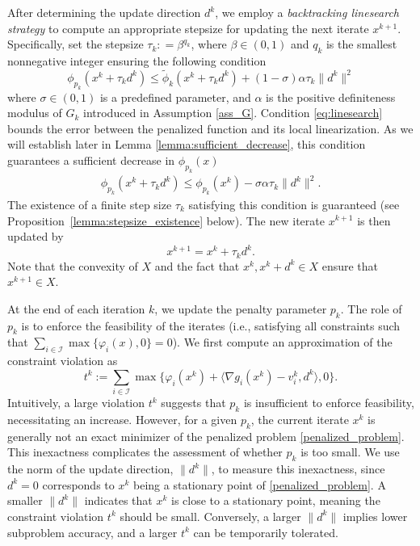 \documentclass[11pt,a4paper]{article}
\theoremstyle{plain}
\begin{document}
After determining the update direction $d^k$, we employ a {\em backtracking linesearch strategy} to compute an appropriate stepsize for updating the next iterate $x^{k+1}$. Specifically, set the stepsize $\tau_k: = \beta^{q_k}$, where $\beta \in (0,1)$ and $q_k$ is the smallest nonnegative integer ensuring the following condition
\begin{equation}\label{eq:linesearch}
{\phi_{p_k}(x^k + \tau_k d^k) \leq \tilde\phi_{k}(x^k+\tau_kd^k) + (1-\sigma) \alpha \tau_k \| d^k \|^2}
\end{equation}
where $\sigma \in (0,1)$ is a predefined parameter, and $\alpha$ is the positive definiteness modulus of $G_k$ introduced in Assumption \ref{ass_G}. {Condition \eqref{eq:linesearch} bounds the error between the penalized function and its local linearization. As we will establish later in Lemma \ref{lemma:sufficient_decrease}, this condition guarantees a sufficient decrease in $\phi_{p_k}(x)$
\begin{equation*}
    \begin{aligned}
        \phi_{p_k}(x^k + \tau_k d^k)\leq\phi_{p_k}(x^k)-\sigma\alpha\tau_k\|d^k\|^2.
    \end{aligned}
\end{equation*}
The existence of a finite step size $\tau_k$ satisfying this condition is guaranteed (see Proposition~\ref{lemma:stepsize_existence} below).} The new iterate $x^{k+1}$ is then updated by
\begin{equation*}
x^{k+1} = x^k + \tau_k d^k.
\end{equation*}
Note that the convexity of $X$ and the fact that $x^k,  x^k + d^k\in X$ ensure that $x^{k+1} \in X$.


At the end of each iteration $k$, we update the penalty parameter $p_k$.
The role of $p_k$ is to enforce the feasibility of the iterates (i.e., satisfying all constraints such that $\sum_{i\in\mathcal I} \max\{\varphi_i(x),0\} = 0$). We first compute an approximation of the constraint violation as
$$
t^k := \sum_{i\in\mathcal I} \max \{ \varphi_i(x^k) + \langle \nabla g_i(x^k) - v_i^k, d^k \rangle, 0 \}.
$$
Intuitively, a large violation $t^k$ suggests that $p_k$ is insufficient to enforce feasibility, necessitating an increase. However, for a given $p_k$, the current iterate $x^k$ is generally not an exact minimizer of the penalized problem \eqref{penalized_problem}. This inexactness complicates the assessment of whether $p_k$ is too small. We use the norm of the update direction, $\|d^k\|$, to measure this inexactness, since $d^k = 0$ corresponds to $x^k$ being a stationary point of \eqref{penalized_problem}. A smaller $\|d^k\|$ indicates that $x^k$ is close to a stationary point, meaning the constraint violation $t^k$ should be small. Conversely, a larger $\|d^k\|$ implies lower subproblem accuracy, and a larger $t^k$ can be temporarily tolerated.
\end{document}
